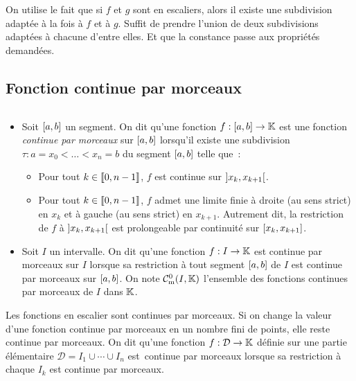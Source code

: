 \documentclass{magnolia}
\begin{document}
\begin{preuve}
On utilise le fait que si $f$ et $g$ sont en escaliers, alors il existe une subdivision adaptée à la fois à $f$ et à $g$. Suffit de prendre l'union de deux subdivisions adaptées à chacune d'entre elles. Et que la constance passe aux propriétés demandées.
\end{preuve}

\subsection{Fonction continue par morceaux}


\begin{definition}[utile=-3]
$\quad$
\begin{itemize}
\item Soit $\left[a,b\right]$ un segment. On dit qu'une fonction
  $f : \left[a,b\right]\to\mathbb{K}$ est une fonction \emph{continue par morceaux} sur
  $\left[a,b\right]$ lorsqu'il existe une subdivision
  \mbox{$\tau : a=x_0<\dots<x_n=b$}
  du segment $\left[a,b\right]$ telle que~:
  \begin{itemize}
  \item Pour tout $k\in\left\llbracket 0,n-1\right\rrbracket$, $f$ est continue sur
    $\left]x_k,x_{k+1}\right[$.
  \item Pour tout $k\in\left\llbracket 0,n-1\right\rrbracket$, $f$ admet une limite finie
    à droite (au sens strict) en $x_k$ et à gauche (au sens strict) en $x_{k+1}$.
    Autrement dit, la restriction de $f$ à $\left]x_k,x_{k+1}\right[$ est
    prolongeable par continuité sur $\left[x_k,x_{k+1}\right]$.
  \end{itemize}
\item Soit $I$ un intervalle. On dit qu'une fonction $f : I\to\mathbb{K}$ est
  continue par morceaux sur $I$ lorsque sa restriction à tout segment
  $\left[a,b\right]$ de $I$ est continue par morceaux sur $\left[a,b\right]$. On note
  $\mathcal{C}_{{\rm m}}^0(I,\mathbb{K})$ l'ensemble des fonctions continues par morceaux de $I$ dans $\mathbb{K}$.
\end{itemize}
\end{definition}

\begin{remarques}
\remarque Les fonctions en escalier sont continues par morceaux.
\remarque[utile=-2] Si on change la valeur d'une fonction continue par morceaux en un
  nombre fini de points, elle reste continue par morceaux.
\remarque On dit qu'une fonction $f:\mathcal{D}\to\mathbb{K}$ définie sur une partie élémentaire $\mathcal{D}=I_1\cup\cdots\cup I_n$ est\
  continue par morceaux lorsque sa restriction à chaque $I_k$ est continue par morceaux.
\end{remarques}
\end{document}
